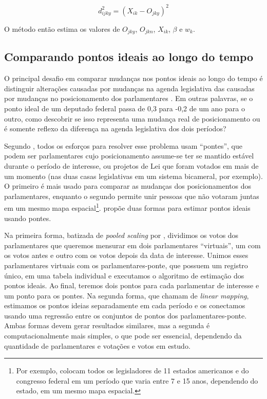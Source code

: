 \documentclass[a4paper,titlepage]{ppgi}\usepackage[]{graphicx}\usepackage[]{color}
\begin{document}
\begin{equation}
d_{ijky}^2 = \left(X_{ik} - O_{jky}\right)^2
\end{equation}

O método então estima os valores de $O_{jky}$, $O_{jkn}$, $X_{ik}$, $\beta$ e
$w_k$.


\subsection{Comparando pontos ideais ao longo do tempo}
\label{cap:fundamentacao:comparando-pontos-ideais-no-tempo}

O principal desafio em comparar mudanças nos pontos ideais ao longo do tempo é
distinguir alterações causadas por mudanças na agenda legislativa das causadas
por mudanças no posicionamento dos parlamentares \cite{Bailey2007}. Em outras
palavras, se o ponto ideal de um deputado federal passa de 0,3 para -0,2 de um ano
para o outro, como descobrir se isso representa uma mudança real de
posicionamento ou é somente reflexo da diferença na agenda legislativa dos dois
períodos?

Segundo , todos os esforços para resolver esse problema
usam ``pontes'', que podem ser parlamentares cujo posicionamento assume-se ter
se mantido estável durante o período de interesse, ou projetos de Lei que
foram votados em mais de um momento (nas duas casas legislativas em um sistema
bicameral, por exemplo). O primeiro é mais usado para comparar as mudanças dos
posicionamentos dos parlamentares, enquanto o segundo permite unir pessoas que
não votaram juntas em um mesmo mapa espacial\footnote{Por exemplo,
 colocam todos os legisladores de 11 estados americanos e
do congresso federal em um período que varia entre 7 e 15 anos, dependendo do
estado, em um mesmo mapa espacial.}.  propõe duas formas
para estimar pontos ideais usando pontes.

Na primeira forma, batizada de \emph{pooled scaling} por ,
dividimos os votos dos parlamentares que queremos mensurar em dois
parlamentares ``virtuais'', um com os votos antes e outro com os votos depois
da data de interesse. Unimos esses parlamentares virtuais com os
parlamentares-ponte, que possuem um registro único, em uma tabela individual e
executamos o algoritmo de estimação dos pontos ideais. Ao final, teremos dois
pontos para cada parlamentar de interesse e um ponto para os pontes. Na
segunda forma, que  chamam de \emph{linear mapping},
estimamos os pontos ideias separadamente em cada período e os conectamos usando
uma regressão entre os conjuntos de pontos dos parlamentares-ponte. Ambas
formas devem gerar resultados similares, mas a segunda é computacionalmente
mais simples, o que pode ser essencial, dependendo da quantidade de
parlamentares e votações e votos em estudo.
\end{document}
